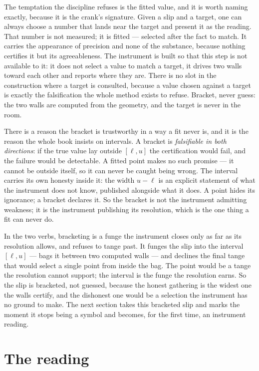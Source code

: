 The temptation the discipline refuses is the fitted value, and it is worth naming exactly, because it is the crank's
signature. Given a slip and a target, one can always choose a number that lands near the target and present it as the
reading. That number is not measured; it is fitted --- selected after the fact to match. It carries the appearance of
precision and none of the substance, because nothing certifies it but its agreeableness. The instrument is built so that this
step is not available to it: it does not select a value to match a target, it drives two walls toward each other and reports
where they are. There is no slot in the construction where a target is consulted, because a value chosen against a target is
exactly the falsification the whole method exists to refuse. Bracket, never guess: the two walls are computed from the
geometry, and the target is never in the room.

There is a reason the bracket is trustworthy in a way a fit never is, and it is the reason the whole book insists on
intervals. A bracket is \emph{falsifiable in both directions}: if the true value lay outside $[\ell, u]$ the certification
would fail, and the failure would be detectable. A fitted point makes no such promise --- it cannot be outside itself, so it
can never be caught being wrong. The interval carries its own honesty inside it: the width $u - \ell$ is an explicit
statement of what the instrument does not know, published alongside what it does. A point hides its ignorance; a bracket
declares it. So the bracket is not the instrument admitting weakness; it is the instrument publishing its resolution, which
is the one thing a fit can never do.

In the two verbs, bracketing is a funge the instrument closes only as far as its resolution allows, and refuses to tange
past. It funges the slip into the interval $[\ell, u]$ --- bags it between two computed walls --- and declines the final
tange that would select a single point from inside the bag. The point would be a tange the resolution cannot support; the
interval is the funge the resolution earns. So the slip is bracketed, not guessed, because the honest gathering is the widest
one the walls certify, and the dishonest one would be a selection the instrument has no ground to make. The next section
takes this bracketed slip and marks the moment it stops being a symbol and becomes, for the first time, an instrument
reading.

\section{The reading}

